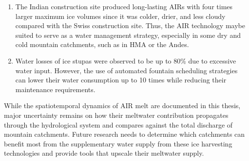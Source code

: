 \begin{enumerate}

  \item The Indian construction site produced long-lasting \ac{AIRs} with four times larger maximum ice volumes
    since it was colder, drier, and less cloudy compared with the Swiss construction site. Thus, the \ac{AIR}
    technology maybe suited to serve as a water management strategy, especially in some dry and cold mountain
    catchments, such as in \ac{HMA} or the Andes.

  \item Water losses of ice stupas were observed to be up to 80\% due to excessive water input. However, the use
    of automated fountain scheduling strategies can lower their water consumption up to 10 times while reducing
    their maintenance requirements.

\end{enumerate}

While the spatiotemporal dynamics of \ac{AIR} melt are documented in this thesis,
major uncertainty remains on how their meltwater contribution propagates through the hydrological system and
compares against the total discharge of mountain catchments. Future research needs to determine which catchments
can benefit most from the supplementary water supply from these ice harvesting technologies and provide tools that
upscale their meltwater supply.


